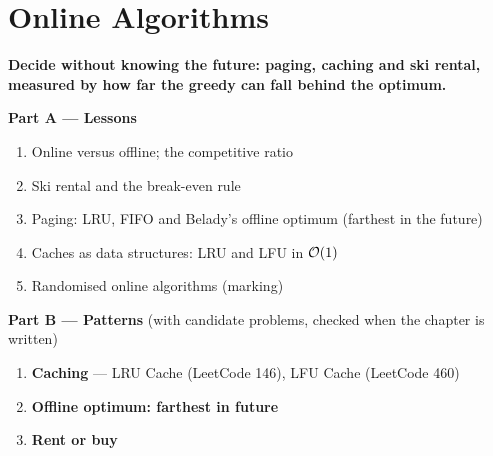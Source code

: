 \chapter{Online Algorithms}
\label{ch:online}

\begin{tcolorbox}[enhanced, colback=white, colframe=secondaryblue, boxrule=1pt, arc=2mm]
\textbf{\large\textcolor{primaryblue}{Decide without knowing the future: paging, caching and ski rental, measured by how far the greedy can fall behind the optimum.}}
\end{tcolorbox}


\begin{plannedbox}
\textbf{Part A --- Lessons}
\begin{enumerate}[leftmargin=*, label=\textbf{A\arabic*.}, itemsep=1pt]
    \item Online versus offline; the competitive ratio
    \item Ski rental and the break-even rule
    \item Paging: LRU, FIFO and Belady's offline optimum (farthest in the future)
    \item Caches as data structures: LRU and LFU in $\mathcal{O}(1)$
    \item Randomised online algorithms (marking)
\end{enumerate}
\textbf{Part B --- Patterns} (with candidate problems, checked when the chapter is written)
\begin{enumerate}[leftmargin=*, label=\textbf{P\arabic*.}, itemsep=1pt]
    \item \textbf{Caching} --- LRU Cache {\small\color{darkgray}(LeetCode 146)}, LFU Cache {\small\color{darkgray}(LeetCode 460)}
    \item \textbf{Offline optimum: farthest in future}
    \item \textbf{Rent or buy}
\end{enumerate}
\end{plannedbox}
